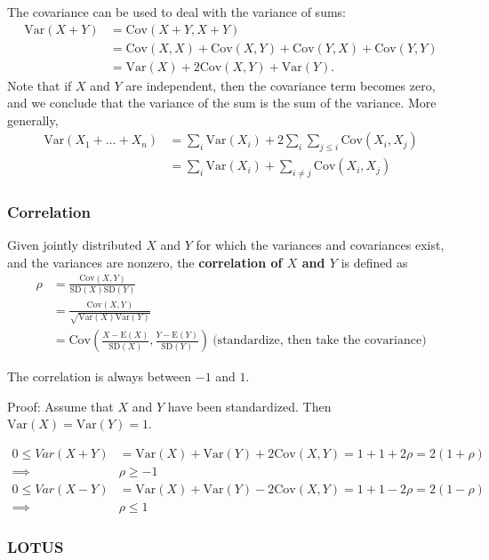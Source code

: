 \documentclass[a4paper,10pt]{article}
\newcommand{\E}{\mathrm{E}}
\newcommand{\Var}{\mathrm{Var}}
\newcommand{\Cov}{\mathrm{Cov}}
\newcommand{\SD}{\mathrm{SD}}
\begin{document}
The covariance can be used to deal with the variance of sums: 
\begin{align*}
    \Var(X+Y) &= \Cov(X+Y, X+Y) \\
    &= \Cov(X, X) + \Cov(X, Y) + \Cov(Y, X) + \Cov(Y, Y) \\
    &= \Var(X) + 2\Cov(X, Y) + \Var(Y).
\end{align*}
Note that if $X$ and $Y$ are independent, then the covariance term becomes zero, and we conclude that the variance of the sum is the sum of the variance. More generally, 
\begin{align*}
    \Var(X_1 + \ldots + X_n) &= \sum_i \Var(X_i) + 2\sum_i \sum_{j \leq i} \Cov(X_i, X_j) \\
    &= \sum_i \Var(X_i) + \sum_{i \neq j} \Cov(X_i, X_j)
\end{align*}

\subsubsection{Correlation}

Given jointly distributed $X$ and $Y$ for which the variances and covariances exist, and the variances are nonzero, the \textbf{correlation of $X$ and $Y$} is defined as 
\begin{align*}
    \rho &= \frac{\Cov(X, Y)}{\SD(X)\SD(Y)} \\
    &= \frac{\Cov(X, Y)}{\sqrt{\Var(X)\Var(Y)}} \\
    &= \Cov\left(\frac{X-\E(X)}{\SD(X)}, \frac{Y-\E(Y)}{\SD(Y)}\right)~\text{(standardize, then take the covariance)}
\end{align*}

The correlation is always between $-1$ and $1$. 

Proof: Assume that $X$ and $Y$ have been standardized. Then $\Var(X) = \Var(Y) = 1$.

\begin{align*}
    0 \leq Var(X+Y) &= \Var(X) + \Var(Y) + 2\Cov(X, Y) = 1 + 1 + 2\rho = 2(1+\rho)\\
    \implies & \rho \geq -1 \\
    0 \leq Var(X-Y) &= \Var(X) + \Var(Y) - 2\Cov(X, Y) = 1 + 1 - 2\rho = 2(1-\rho)\\
    \implies & \rho \leq 1
\end{align*}

\subsubsection{LOTUS}
\end{document}
